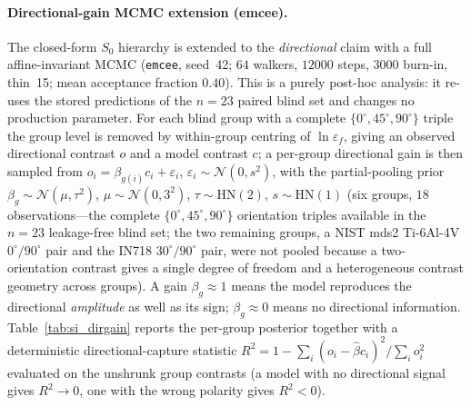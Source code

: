 \documentclass[11pt,a4paper,twocolumn]{article}
\providecommand{\ang}[1]{\ensuremath{#1^{\circ}}}
\begin{document}
\paragraph{Directional-gain MCMC extension (emcee).}
The closed-form $S_0$ hierarchy is extended to the \emph{directional} claim with a full affine-invariant MCMC (\texttt{emcee}, seed~42; $64$ walkers, $12000$ steps, $3000$ burn-in, thin~15; mean acceptance fraction $0.40$). This is a purely post-hoc analysis: it re-uses the stored predictions of the $n=23$ paired blind set and changes no production parameter. For each blind group with a complete $\{\ang{0},\ang{45},\ang{90}\}$ triple the group level is removed by within-group centring of $\ln\varepsilon_f$, giving an observed directional contrast $o$ and a model contrast $c$; a per-group directional gain is then sampled from $o_i = \beta_{g(i)} c_i + \varepsilon_i$, $\varepsilon_i\sim\mathcal{N}(0,s^2)$, with the partial-pooling prior $\beta_g\sim\mathcal{N}(\mu,\tau^2)$, $\mu\sim\mathcal{N}(0,3^2)$, $\tau\sim\mathrm{HN}(2)$, $s\sim\mathrm{HN}(1)$ (six groups, $18$ observations---the complete $\{\ang{0},\ang{45},\ang{90}\}$ orientation triples available in the $n=23$ leakage-free blind set; the two remaining groups, a NIST mds2 Ti-6Al-4V $\ang{0}/\ang{90}$ pair and the IN718 $\ang{30}/\ang{90}$ pair, were not pooled because a two-orientation contrast gives a single degree of freedom and a heterogeneous contrast geometry across groups). A gain $\beta_g\approx1$ means the model reproduces the directional \emph{amplitude} as well as its sign; $\beta_g\approx0$ means no directional information. Table~\ref{tab:si_dirgain} reports the per-group posterior together with a deterministic directional-capture statistic $R^2 = 1-\sum_i(o_i-\hat\beta c_i)^2/\sum_i o_i^2$ evaluated on the unshrunk group contrasts (a model with no directional signal gives $R^2\to0$, one with the wrong polarity gives $R^2<0$).
\end{document}
